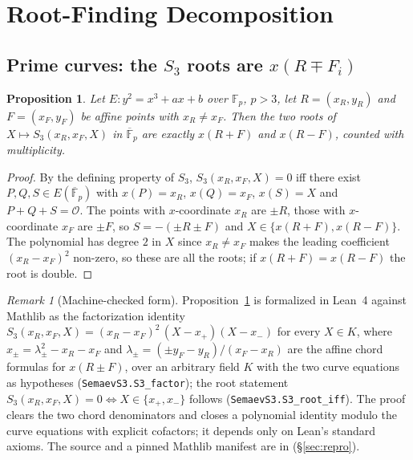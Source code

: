 \documentclass[10pt,a4paper]{article}
\newtheorem{proposition}{Proposition}
\theoremstyle{remark}
\newtheorem{remark}{Remark}
\newcommand{\FF}{\mathbb{F}}
\newcommand{\Sem}[1]{S_{#1}}
\newcommand{\code}[1]{\texttt{#1}}
\begin{document}
\section{Root-Finding Decomposition}
\label{sec:algorithms}

\subsection{Prime curves: the $\Sem{3}$ roots are $x(R \mp F_i)$}

\begin{proposition}
\label{prop:s3roots}
Let $E: y^2 = x^3 + ax + b$ over $\FF_p$, $p > 3$, let $R = (x_R, y_R)$
and $F = (x_F, y_F)$ be affine points with $x_R \neq x_F$. Then the two
roots of $X \mapsto \Sem{3}(x_R, x_F, X)$ in $\overline{\FF}_p$ are
exactly $x(R + F)$ and $x(R - F)$, counted with multiplicity.
\end{proposition}

\begin{proof}
By the defining property of $\Sem{3}$, $\Sem{3}(x_R, x_F, X) = 0$ iff
there exist $P, Q, S \in E(\overline{\FF}_p)$ with $x(P) = x_R$,
$x(Q) = x_F$, $x(S) = X$ and $P + Q + S = \mathcal{O}$. The points with
$x$-coordinate $x_R$ are $\pm R$, those with $x$-coordinate $x_F$ are
$\pm F$, so $S = -(\pm R \pm F)$ and $X \in \{x(R+F), x(R-F)\}$. The
polynomial has degree $2$ in $X$ since $x_R \neq x_F$ makes the leading
coefficient $(x_R - x_F)^2$ non-zero, so these are all the roots; if
$x(R+F) = x(R-F)$ the root is double.
\end{proof}

\begin{remark}[Machine-checked form]
\label{rem:lean}
Proposition~\ref{prop:s3roots} is formalized in Lean~4 against Mathlib
as the factorization identity
$\Sem{3}(x_R, x_F, X) = (x_R - x_F)^2\,(X - x_+)(X - x_-)$ for every
$X \in K$, where $x_\pm = \lambda_\pm^2 - x_R - x_F$ and
$\lambda_\pm = (\pm y_F - y_R)/(x_F - x_R)$ are the affine chord formulas
for $x(R \pm F)$, over an arbitrary field $K$ with the two curve equations
as hypotheses (\code{SemaevS3.S3\_factor}); the root statement
$\Sem{3}(x_R,x_F,X) = 0 \iff X \in \{x_+, x_-\}$ follows
(\code{SemaevS3.S3\_root\_iff}). The proof clears the two chord
denominators and closes a polynomial identity modulo the curve equations
with explicit cofactors; it depends only on Lean's standard axioms. The
source and a pinned Mathlib manifest are in
 (\S\ref{sec:repro}).
\end{remark}
\end{document}
